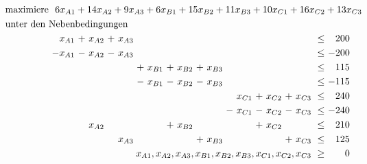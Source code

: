 \documentclass [a4paper,11pt]{article}
\begin{document}
\begin{enumerate}
\begin{enumerate}
                \begin{align*}
                \begin{alignedat}{12}
                & \text{maximiere } \rlap{ $ 6x_{A1} + 14x_{A2} + 9x_{A3} + 6x_{B1} + 15x_{B2} + 11x_{B3} + 10x_{C1} + 16x_{C2} + 13x_{C3} $} &&&&&&&&&&&&&&&&&&& \\
                & \rlap{unter den Nebenbedingungen} & & & & & & & & & & & & & & & & & & & \\
                &&  x_{A1} &\ + &\ x_{A2} &\ + &\ x_{A3} &    &  & & & & & & & & & & &\ \leq &\  200 \\
                && -x_{A1} &\ - &\ x_{A2} &\ - &\ x_{A3} &    &  & & & & & & & & & & &\ \leq &\ -200 \\
                &&  &  &  & & &\ + &\ x_{B1} &\ + &\ x_{B2} &\ + &\ x_{B3} & & & & & & &\ \leq &\ 115 \\
                &&  &  &  & & &\ - &\ x_{B1} &\ - &\ x_{B2} &\ - &\ x_{B3} & & & & & & &\ \leq &\ -115 \\
                &&  &  &  & &  & & & & & & & &\ x_{C1} &\ + &\ x_{C2} &\ + &\ x_{C3} &\ \leq &\ 240 \\
                &&  &  &  & &  & & & & & & &\ - &\ x_{C1} &\ - &\ x_{C2} &\ - &\ x_{C3} &\ \leq &\ -240 \\
                &&  &  &\ x_{A2} & & & & &\ + &\ x_{B2} & & & & &\ + &\ x_{C2} & & &\ \leq &\  210 \\
                &&  &  &  & &\ x_{A3} & & & & &\ + &\ x_{B3} & & & & &\ + &\ x_{C3} &\ \leq &\ 125 \\
                && & & & & & & & & & & & & & & & & \llap{$x_{A1}, x_{A2}, x_{A3},x_{B1}, x_{B2}, x_{B3}, x_{C1}, x_{C2}, x_{C3}$} &\ \geq &\ 0
                \end{alignedat}
                \end{align*}

        \end{enumerate}

    \end{enumerate}
\end{document}
